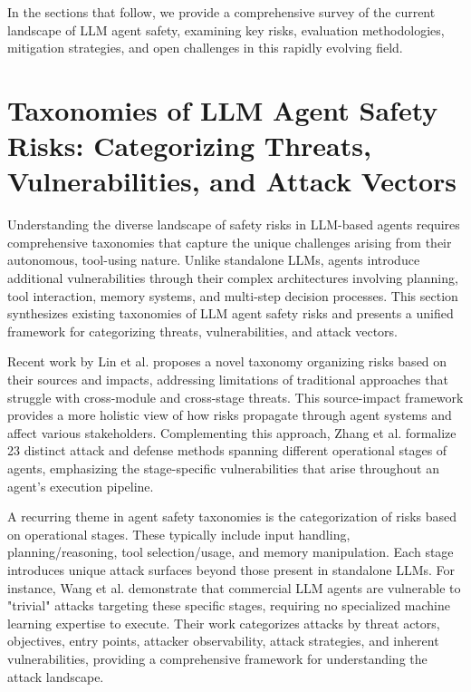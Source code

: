 \documentclass[conference]{IEEEtran}
\begin{document}
In the sections that follow, we provide a comprehensive survey of the current landscape of LLM agent safety, examining key risks, evaluation methodologies, mitigation strategies, and open challenges in this rapidly evolving field.



\section{Taxonomies of LLM Agent Safety Risks: Categorizing Threats, Vulnerabilities, and Attack Vectors}

Understanding the diverse landscape of safety risks in LLM-based agents requires comprehensive taxonomies that capture the unique challenges arising from their autonomous, tool-using nature. Unlike standalone LLMs, agents introduce additional vulnerabilities through their complex architectures involving planning, tool interaction, memory systems, and multi-step decision processes. This section synthesizes existing taxonomies of LLM agent safety risks and presents a unified framework for categorizing threats, vulnerabilities, and attack vectors.

Recent work by Lin et al. \cite{2411.09523} proposes a novel taxonomy organizing risks based on their sources and impacts, addressing limitations of traditional approaches that struggle with cross-module and cross-stage threats. This source-impact framework provides a more holistic view of how risks propagate through agent systems and affect various stakeholders. Complementing this approach, Zhang et al. \cite{2410.02644} formalize 23 distinct attack and defense methods spanning different operational stages of agents, emphasizing the stage-specific vulnerabilities that arise throughout an agent's execution pipeline.

A recurring theme in agent safety taxonomies is the categorization of risks based on operational stages. These typically include input handling, planning/reasoning, tool selection/usage, and memory manipulation. Each stage introduces unique attack surfaces beyond those present in standalone LLMs. For instance, Wang et al. \cite{2502.08586} demonstrate that commercial LLM agents are vulnerable to "trivial" attacks targeting these specific stages, requiring no specialized machine learning expertise to execute. Their work categorizes attacks by threat actors, objectives, entry points, attacker observability, attack strategies, and inherent vulnerabilities, providing a comprehensive framework for understanding the attack landscape.
\end{document}
